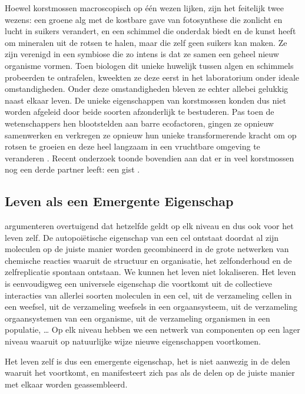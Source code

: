 \documentclass[
  11pt,
]{book}
\begin{document}
Hoewel korstmossen macroscopisch op één wezen lijken, zijn het feitelijk twee wezens: een groene alg met de kostbare gave van fotosynthese die zonlicht en lucht in suikers verandert, en een schimmel die onderdak biedt en de kunst heeft om mineralen uit de rotsen te halen, maar die zelf geen suikers kan maken. Ze zijn verenigd in een symbiose die zo intens is dat ze samen een geheel nieuw organisme vormen. Toen biologen dit unieke huwelijk tussen algen en schimmels probeerden te ontrafelen, kweekten ze deze eerst in het laboratorium onder ideale omstandigheden. Onder deze omstandigheden bleven ze echter allebei gelukkig naast elkaar leven. De unieke eigenschappen van korstmossen konden dus niet worden afgeleid door beide soorten afzonderlijk te bestuderen. Pas toen de wetenschappers hen blootstelden aan barre ecofactoren, gingen ze opnieuw samenwerken en verkregen ze opnieuw hun unieke transformerende kracht om op rotsen te groeien en deze heel langzaam in een vruchtbare omgeving te veranderen \citep{Kimmerer2013}. Recent onderzoek toonde bovendien aan dat er in veel korstmossen nog een derde partner leeft: een gist \citep{Spribille2016}.

\subsection{Leven als een Emergente Eigenschap}\label{leven-als-een-emergente-eigenschap}

\citet{capraLuisi2014} argumenteren overtuigend dat hetzelfde geldt op elk niveau en dus ook voor het leven zelf. De autopoiëtische eigenschap van een cel ontstaat doordat al zijn moleculen op de juiste manier worden gecombineerd in de grote netwerken van chemische reacties waaruit de structuur en organisatie, het zelfonderhoud en de zelfreplicatie spontaan ontstaan. We kunnen het leven niet lokaliseren. Het leven is eenvoudigweg een universele eigenschap die voortkomt uit de collectieve interacties van allerlei soorten moleculen in een cel, uit de verzameling cellen in een weefsel, uit de verzameling weefsels in een orgaansysteem, uit de verzameling orgaansystemen van een organisme, uit de verzameling organismen in een populatie, \ldots{} Op elk niveau hebben we een netwerk van componenten op een lager niveau waaruit op natuurlijke wijze nieuwe eigenschappen voortkomen.

Het leven zelf is dus een emergente eigenschap, het is niet aanwezig in de delen waaruit het voortkomt, en manifesteert zich pas als de delen op de juiste manier met elkaar worden geassembleerd.
\end{document}
